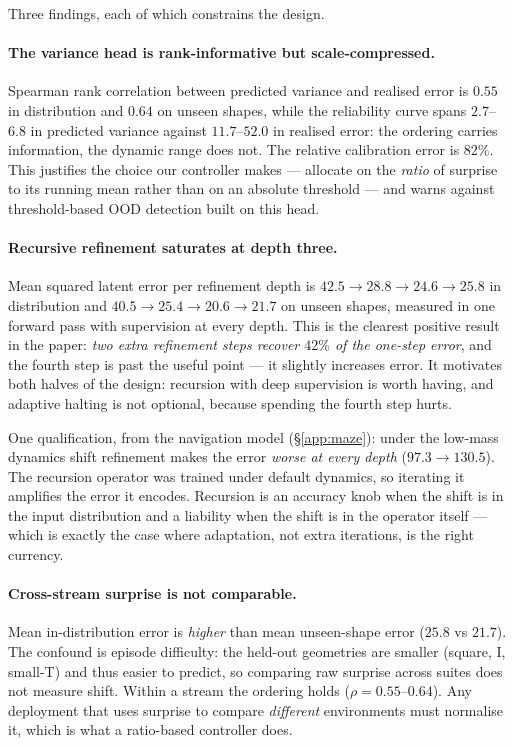 Three findings, each of which constrains the design.

\paragraph{The variance head is rank-informative but scale-compressed.} Spearman rank
correlation between predicted variance and realised error is $0.55$ in distribution and $0.64$
on unseen shapes, while the reliability curve spans $2.7$--$6.8$ in predicted variance against
$11.7$--$52.0$ in realised error: the ordering carries information, the dynamic range does not.
The relative calibration error is $82\%$. This justifies the choice our controller makes ---
allocate on the \emph{ratio} of surprise to its running mean rather than on an absolute
threshold --- and warns against threshold-based OOD detection built on this head.

\paragraph{Recursive refinement saturates at depth three.} Mean squared latent error per
refinement depth is $42.5 \to 28.8 \to 24.6 \to 25.8$ in distribution and $40.5 \to 25.4 \to
20.6 \to 21.7$ on unseen shapes, measured in one forward pass with supervision at every depth.
This is the clearest positive result in the paper: \emph{two extra refinement steps recover
$42\%$ of the one-step error}, and the fourth step is past the useful point --- it slightly
increases error. It motivates both halves of the design: recursion with deep supervision is
worth having, and adaptive halting is not optional, because spending the fourth step hurts.

One qualification, from the navigation model (\S\ref{app:maze}): under the low-mass dynamics
shift refinement makes the error \emph{worse at every depth} ($97.3 \to 130.5$). The recursion
operator was trained under default dynamics, so iterating it amplifies the error it encodes.
Recursion is an accuracy knob when the shift is in the input distribution and a liability when
the shift is in the operator itself --- which is exactly the case where adaptation, not extra
iterations, is the right currency.

\paragraph{Cross-stream surprise is not comparable.} Mean in-distribution error is
\emph{higher} than mean unseen-shape error ($25.8$ vs $21.7$). The confound is episode
difficulty: the held-out geometries are smaller (square, I, small-T) and thus easier to predict,
so comparing raw surprise across suites does not measure shift. Within a stream the ordering
holds ($\rho = 0.55$--$0.64$). Any deployment that uses surprise to compare \emph{different}
environments must normalise it, which is what a ratio-based controller does.

